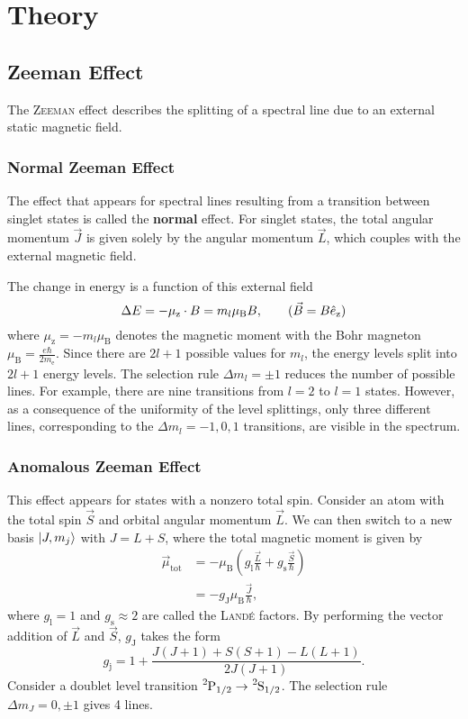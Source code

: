 \chapter{Theory}
\section{Zeeman Effect}\label{sec:zeeman}
The \textsc{Zeeman} effect describes the splitting of a spectral line due to an external static magnetic field.

\subsection{Normal Zeeman Effect}
The effect that appears for spectral lines resulting from a transition between singlet states is called the \textbf{normal} effect.
For singlet states, the total angular momentum $\vec{J}$ is given solely by the angular momentum $\vec{L}$, which couples with the external magnetic field.

The change in energy is a function of this external field
\begin{equation*}
	\Delta E = -\mu_\text{z}\cdot B=m_l\mu_\text{B}B, \tag{$\vec{B}=B\hat{e}_\text{z}$}
\end{equation*}
where $\mu_\text{z}=-m_l\mu_\text{B}$ denotes the magnetic moment with the Bohr magneton $\mu_\text{B}=\frac{e\hbar}{2m_\text{e}}$.
Since there are $2l+1$ possible values for $m_l$, the energy levels split into $2l+1$ energy levels.
The selection rule $\Delta m_l=\pm 1$ reduces the number of possible lines.
For example, there are nine transitions from $l=2$ to $l=1$ states.
However, as a consequence of the uniformity of the level splittings, only three different lines, corresponding to the $\Delta m_l=-1,0,1$ transitions, are visible in the spectrum.

\subsection{Anomalous Zeeman Effect}
This effect appears for states with a nonzero total spin.
Consider an atom with the total spin $\vec{S}$ and orbital angular momentum $\vec{L}$.
We can then switch to a new basis $\ket{J, m_j}$ with $J=L+S$, where the total magnetic moment is given by
\begin{align*}
	\vec{\mu}_\text{tot} &= -\mu_\text{B}\left(g_\text{l}\frac{\vec{L}}{\hbar} + g_\text{s}\frac{\vec{S}}{\hbar}\right) \\
	&= -g_\text{J}\mu_\text{B}\frac{\vec{J}}{\hbar},
\end{align*}
where $g_\text{l} = 1$ and $g_\text{s}\approx 2$ are called the \textsc{Landé} factors.
By performing the vector addition of $\vec{L}$ and $\vec{S}$, $g_\text{J}$ takes the form
\begin{equation*}
	g_\text{j} = 1+\frac{J(J+1)+S(S+1)-L(L+1)}{2J(J+1)}.
\end{equation*}
Consider a doublet level transition $\ce{^{2}P}_{1/2}\rightarrow \ce{^{2}S}_{1/2}$.
The selection rule $\Delta m_J =0, \pm 1$ gives 4 lines.

